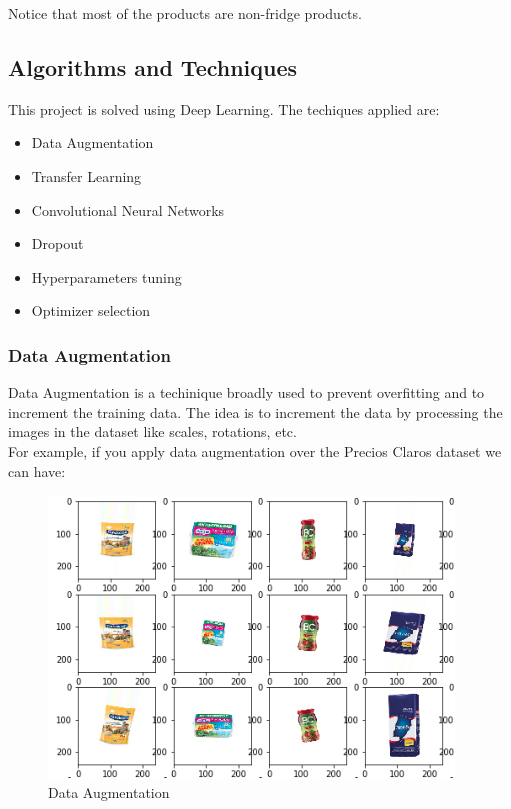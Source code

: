 \documentclass[a4paper,10pt]{article}
\begin{document}
\newpage

Notice that most of the products are non-fridge products.

\subsection{Algorithms and Techniques}

This project is solved using Deep Learning. The techiques applied are:

\begin{itemize}
  \item Data Augmentation
  \item Transfer Learning
  \item Convolutional Neural Networks
  \item Dropout
  \item Hyperparameters tuning
  \item Optimizer selection
\end{itemize}

\subsubsection{Data Augmentation}

Data Augmentation is a techinique broadly used to prevent overfitting and to increment the training data. The idea is to increment the data by processing the images in the dataset like scales, rotations, etc. \\

For example, if you apply data augmentation over the Precios Claros dataset we can have:

  
\begin{figure}[ht]
  \includegraphics[width=\linewidth]{data_augmentation.png}
  \caption{Data Augmentation}
\end{figure}
\end{document}
